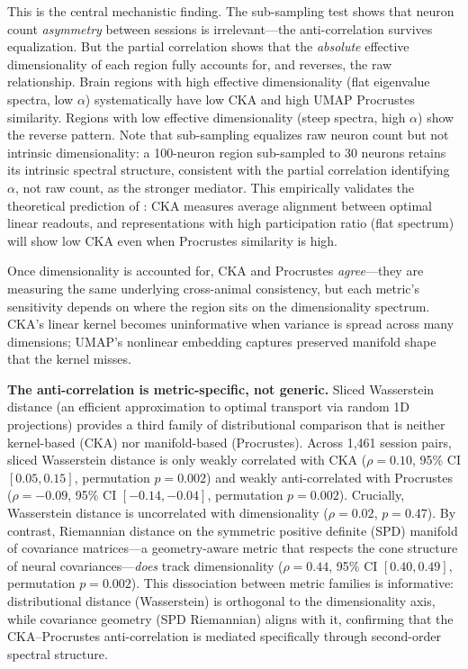 \documentclass{article}
\begin{document}
This is the central mechanistic finding. The sub-sampling test shows that neuron count \emph{asymmetry} between sessions is irrelevant---the anti-correlation survives equalization. But the partial correlation shows that the \emph{absolute} effective dimensionality of each region fully accounts for, and reverses, the raw relationship. Brain regions with high effective dimensionality (flat eigenvalue spectra, low $\alpha$) systematically have low CKA and high UMAP Procrustes similarity. Regions with low effective dimensionality (steep spectra, high $\alpha$) show the reverse pattern. Note that sub-sampling equalizes raw neuron count but not intrinsic dimensionality: a 100-neuron region sub-sampled to 30 neurons retains its intrinsic spectral structure, consistent with the partial correlation identifying $\alpha$, not raw count, as the stronger mediator. This empirically validates the theoretical prediction of \citet{harvey2024representational}: CKA measures average alignment between optimal linear readouts, and representations with high participation ratio (flat spectrum) will show low CKA even when Procrustes similarity is high.

Once dimensionality is accounted for, CKA and Procrustes \emph{agree}---they are measuring the same underlying cross-animal consistency, but each metric's sensitivity depends on where the region sits on the dimensionality spectrum. CKA's linear kernel becomes uninformative when variance is spread across many dimensions; UMAP's nonlinear embedding captures preserved manifold shape that the kernel misses.

\textbf{The anti-correlation is metric-specific, not generic.} Sliced Wasserstein distance (an efficient approximation to optimal transport via random 1D projections) provides a third family of distributional comparison that is neither kernel-based (CKA) nor manifold-based (Procrustes). Across 1,461 session pairs, sliced Wasserstein distance is only weakly correlated with CKA ($\rho = 0.10$, 95\% CI $[0.05, 0.15]$, permutation $p = 0.002$) and weakly anti-correlated with Procrustes ($\rho = -0.09$, 95\% CI $[-0.14, -0.04]$, permutation $p = 0.002$). Crucially, Wasserstein distance is uncorrelated with dimensionality ($\rho = 0.02$, $p = 0.47$). By contrast, Riemannian distance on the symmetric positive definite (SPD) manifold of covariance matrices---a geometry-aware metric that respects the cone structure of neural covariances---\emph{does} track dimensionality ($\rho = 0.44$, 95\% CI $[0.40, 0.49]$, permutation $p = 0.002$). This dissociation between metric families is informative: distributional distance (Wasserstein) is orthogonal to the dimensionality axis, while covariance geometry (SPD Riemannian) aligns with it, confirming that the CKA--Procrustes anti-correlation is mediated specifically through second-order spectral structure.
\end{document}
